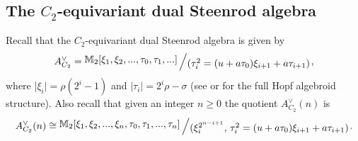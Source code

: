 \documentclass{amsart}
\theoremstyle{definition}
\theoremstyle{plain}
\numberwithin{theorem}{section}
\numberwithin{equation}{section}
\numberwithin{figure}{section}
\newcommand{\0}{\langle 0 \rangle }
\newcommand{\bigslant}[2]{{\raisebox{.2em}{$#1$}\left/\raisebox{-.2em}{$#2$}\right.}}
\begin{document}
\subsection{The $C_2$-equivariant dual Steenrod algebra}
{ Recall that the $C_2$-equivariant dual Steenrod algebra is given by 
$$
A_{C_2}^\vee =\bigslant{\mathbb{M}_2[\xi_1,\xi_2,...,\tau_0,\tau_1,...]}{(\tau_i^2=(u+a\tau_0)\xi_{i+1}+a\tau_{i+1})},
$$
where |$\xi_i|=\rho(2^i-1)$ and $|\tau_i|=2^i\rho-\sigma$ (see \cite[Theorem 6.41]{HuKriz01} or \cite[Theorem 2.14]{LiShiWAngXu19} for the full Hopf algebroid structure). Also recall that given an integer $n \geq 0$ the quotient $A_{C_2}^\vee  (n)$ is %
\[
A_{C_2}^\vee(n) \cong \bigslant{\mathbb{M}_2[\xi_1,\xi_2,..., \xi_n, \tau_0,\tau_1,..., \tau_n]}{(\xi_i^{2^{n-i+1}},\,\tau_i^2=(u+a\tau_0)\xi_{i+1}+a\tau_{i+1})}.
\]}
\end{document}
